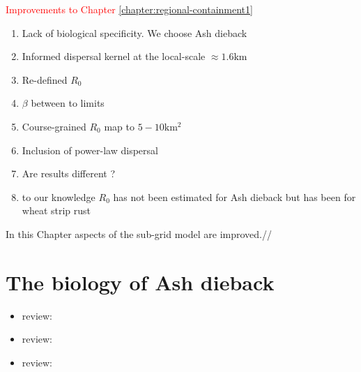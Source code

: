 \textcolor{red}{Improvements to Chapter \ref{chapter:regional-containment1}}
\begin{enumerate}
    \item Lack of biological specificity. We choose Ash dieback%
    \item Informed dispersal kernel at the local-scale $\approx 1.6\mathrm{km}$
    \item Re-defined $R_0$
    \item $\beta$ between to limits
    \item Course-grained $R_0$ map to $5-10\mathrm{km^2}$
    \item Inclusion of power-law dispersal
    \item Are results different ?
    \item to our knowledge $R_0$ has not been estimated for Ash dieback but has been for wheat strip rust \cite{segarra2001epidemic}
\end{enumerate}

In this Chapter aspects of the sub-grid model are improved.//
\section{The biology of Ash dieback} %
\begin{itemize}
    \item review: \cite{ash-dieback-costs}
    \item review: \cite{doi:10.1111/1365-2745.13383}
    \item review: \cite{ash-tree1}
\end{itemize}

